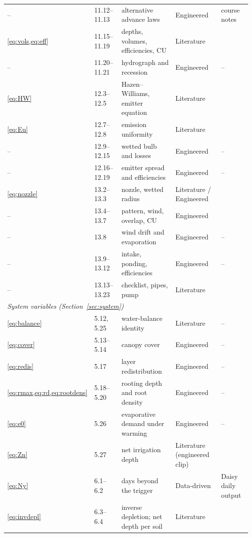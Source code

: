 \begin{longtable}{p{1.7cm}p{1.6cm}p{4.9cm}p{2.2cm}p{3.4cm}}
-- & 11.12--11.13 & alternative advance laws & Engineered & course notes\\
\cref{eq:vols,eq:eff} & 11.15--11.19 & depths, volumes, efficiencies, CU & Literature & \citet{Walker1987,Burt1997,Christiansen1942}\\
-- & 11.20--11.21 & hydrograph and recession & Engineered & --\\
\cref{eq:HW} & 12.3--12.5 & Hazen--Williams, emitter equation & Literature & \citet{Hazen1905,KellerKarmeli1974}\\
\cref{eq:Eu} & 12.7--12.8 & emission uniformity & Literature & \citet{KellerKarmeli1974}\\
-- & 12.9--12.15 & wetted bulb and losses & Engineered & --\\
-- & 12.16--12.19 & emitter spread and efficiencies & Engineered & --\\
\cref{eq:nozzle} & 13.2--13.3 & nozzle, wetted radius & Literature / Engineered & \citet{Keller1990}\\
-- & 13.4--13.7 & pattern, wind, overlap, CU & Engineered & \citet{Christiansen1942}\\
-- & 13.8 & wind drift and evaporation & Engineered & --\\
-- & 13.9--13.12 & intake, ponding, efficiencies & Engineered & --\\
-- & 13.13--13.23 & checklist, pipes, pump & Literature & \citet{Keller1990,Blasius1913}\\\midrule
\multicolumn{5}{l}{\emph{System variables (Section~\ref{sec:system})}}\\
\cref{eq:balance} & 5.12, 5.25 & water-balance identity & Literature & --\\
\cref{eq:cover} & 5.13--5.14 & canopy cover & Engineered & --\\
\cref{eq:redis} & 5.17 & layer redistribution & Engineered & --\\
\cref{eq:rmax,eq:rd,eq:rootdens} & 5.18--5.20 & rooting depth and root density & Engineered & --\\
\cref{eq:e0} & 5.26 & evaporative demand under warming & Engineered & --\\
\cref{eq:Zn} & 5.27 & net irrigation depth & Literature (engineered clip) & \citet{Allen1998}\\
\cref{eq:Ny} & 6.1--6.2 & days beyond the trigger & Data-driven & Daisy daily output\\
\cref{eq:invdepl} & 6.3--6.4 & inverse depletion; net depth per soil & Literature & \citet{vanGenuchten1980,Allen1998}\\

\end{longtable}
